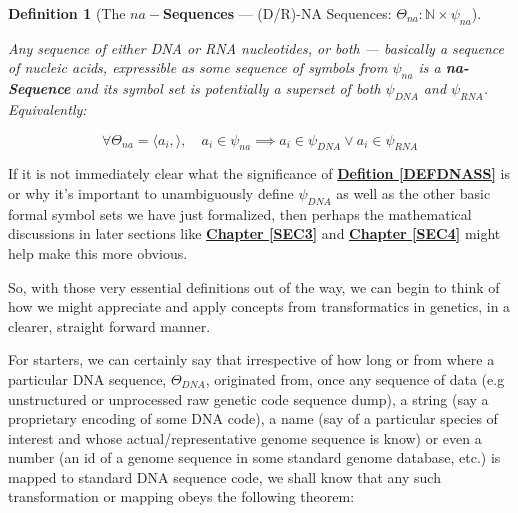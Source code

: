 \documentclass[a4paper, 18pt]{book} %
\newtheorem{defn}{Definition}
\begin{document}
\begin{defn}[The \textbf{$na-$Sequences} --- (D/R)-NA Sequences: $\Theta_{na}:\mathbb{N} \times \psi_{na}$]
\label{DEFNASEQ}

Any sequence of either DNA or RNA nucleotides, or both --- basically a sequence of nucleic acids, expressible as some sequence of symbols from $\psi_{na}$ is a \textbf{na-Sequence} and its symbol set is potentially a superset of both $\psi_{DNA}$ and $\psi_{RNA}$. Equivalently:

\vspace{1em}

\begin{equation}
\label{EQNASEQ}
\forall \Theta_{na} = \langle a_i, \rangle, \quad a_i \in \psi_{na} \implies a_i \in \psi_{DNA} \lor a_i \in \psi_{RNA}
\end{equation}

\end{defn}

\vspace{2em}


If it is not immediately clear what the significance of \textbf{\hyperref[DEFDNASS]{Defition \ref{DEFDNASS}}} is or why it's important to unambiguously define $\psi_{DNA}$ as well as the other basic formal symbol sets we have just formalized, then perhaps the mathematical discussions in later sections like \textbf{\hyperref[SEC3]{Chapter \ref{SEC3}}} and \textbf{\hyperref[SEC4]{Chapter \ref{SEC4}}} might help make this more obvious.

So, with those very essential definitions out of the way, we can begin to think of how we might appreciate and apply concepts from transformatics in genetics, in a clearer, straight forward manner.

For starters, we can certainly say that irrespective of how long or from where a particular DNA sequence, $\Theta_{DNA}$, originated from, once any sequence of data (e.g unstructured or unprocessed raw genetic code sequence dump), a string (say a proprietary encoding of some DNA code), a name (say of a particular species of interest and whose actual/representative genome sequence is know) or even a number (an id of a genome sequence in some standard genome database, etc.) is mapped to standard
DNA sequence code, we shall know that any such transformation or mapping obeys the following theorem:

\vspace{2em}
\end{document}
